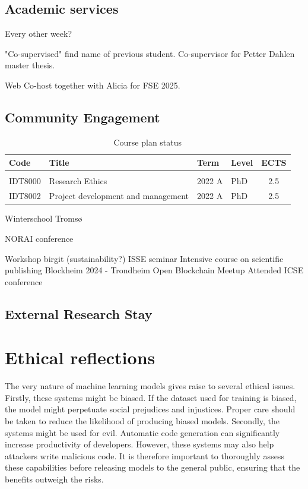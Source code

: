 \documentclass[12pt]{book}
\begin{document}
\subsection{Academic services}

Every other week?

"Co-supervised" find name of previous student.
Co-supervisor for Petter Dahlen master thesis.

Web Co-host together with Alicia for FSE 2025.

\subsection{Community Engagement}

\begin{table}[htp]
    \newcommand\T{\rule{0pt}{2.6ex}}       %
    \newcommand\B{\rule[-1.2ex]{0pt}{0pt}} %
    \centering
    \caption{Course plan status}
    \label{tab:my_label}
    
    \begin{tabularx}{\textwidth}{lllXc}
        \toprule
        \textbf{Code} & \textbf{Title} & \textbf{Term} & \textbf{Level} & \textbf{ECTS}\\
        \midrule
        \multicolumn{5}{l}{\cellcolor{green!20}{\textbf{Completed}}} \bigstrut\\
        \T IDT8000 & Research Ethics & 2022 A & PhD & 2.5\\
        IDT8002 & Project development and management & 2022 A & PhD & 2.5\\
        
    \end{tabularx}
\end{table}

Winterschool Tromsø


NORAI conference

Workshop birgit (sustainability?)
ISSE seminar
Intensive course on scientific publishing
Blockheim 2024 - Trondheim Open Blockchain Meetup
Attended ICSE conference


\subsection{External Research Stay}



\section{Ethical reflections}
The very nature of machine learning models gives raise to several ethical issues. Firstly, these systems might be biased. If the dataset used for training is biased, the model might perpetuate social prejudices and injustices. Proper care should be taken to reduce the likelihood of producing biased models. Secondly, the systems might be used for evil. Automatic code generation can significantly increase productivity of developers. However, these systems may also help attackers write malicious code. It is therefore important to thoroughly assess these capabilities before releasing models to the general public, ensuring that the benefits outweigh the risks.
\end{document}
